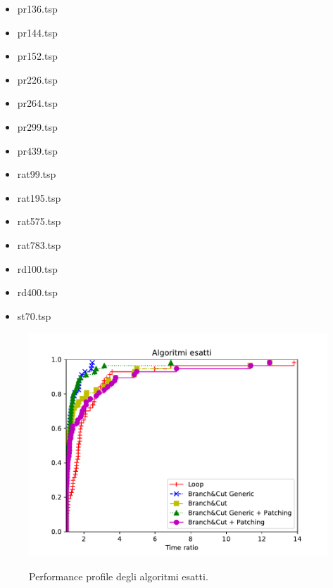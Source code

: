 \begin{center}
\begin{multicols}{4}
\begin{itemize}
\item{pr136.tsp}
\item{pr144.tsp}
\item{pr152.tsp}
\item{pr226.tsp}
\item{pr264.tsp}
\item{pr299.tsp}
\item{pr439.tsp}
\item{rat99.tsp}
\item{rat195.tsp}
\item{rat575.tsp}
\item{rat783.tsp}
\item{rd100.tsp}
\item{rd400.tsp}
\item{st70.tsp}
\end{itemize}
\end{multicols}
\end{center}

\begin{figure}[h] 
\begin{center} 
  \includegraphics[scale=0.8]{Images/pp_exact}\\ 
  \caption{\footnotesize{Performance profile degli algoritmi esatti.}}
  \label{perf_profile} 
\end{center} 
\end{figure}

